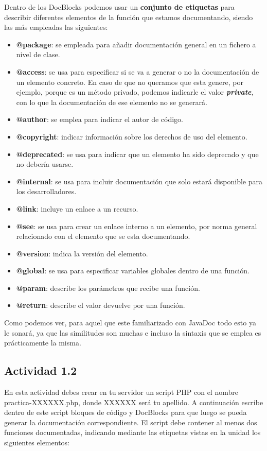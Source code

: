 Dentro de los DocBlocks podemos usar un \textbf{conjunto de etiquetas} para describir diferentes elementos de la función que estamos documentando, siendo las más empleadas las siguientes:

\begin{itemize}
    \item \textbf{@package}: se empleada para añadir documentación general en un fichero a nivel de clase.
    \item \textbf{@access}: se usa para especificar si se va a generar o no la documentación de un elemento concreto. En caso de que no queramos que esta genere, por ejemplo, porque es un método privado, podemos indicarle el valor \textbf{\textit{private}}, con lo que la documentación de ese elemento no se generará.
    \item \textbf{@author}: se emplea para indicar el autor de código.
    \item \textbf{@copyright}: indicar información sobre los derechos de uso del elemento.
    \item \textbf{@deprecated}: se usa para indicar que un elemento ha sido deprecado y que no debería usarse.
    \item \textbf{@internal}: se usa para incluir documentación que solo estará disponible para los desarrolladores.
    \item \textbf{@link}: incluye un enlace a un recurso.
    \item \textbf{@see}: se usa para crear un enlace interno a un elemento, por norma general relacionado con el elemento que se esta
    documentando.
    \item \textbf{@version}: indica la versión del elemento.
    \item \textbf{@global}: se usa para especificar variables globales dentro de una función.
    \item \textbf{@param}: describe los parámetros que recibe una función.
    \item \textbf{@return}: describe el valor devuelve por una función.
\end{itemize}

Como podemos ver, para aquel que este familiarizado con JavaDoc todo esto ya le sonará, ya que las similitudes son muchas e incluso la sintaxis que se emplea es prácticamente la misma.

\subsection{Actividad 1.2}
En esta actividad debes crear en tu servidor un script PHP con el nombre practica-XXXXXX.php, donde XXXXXX será tu apellido. A continuación escribe dentro de este script bloques de código y DocBlocks para que luego se pueda generar la documentación correspondiente. El script debe contener al menos dos funciones documentadas, indicando mediante las etiquetas vistas en la unidad los siguientes elementos:

